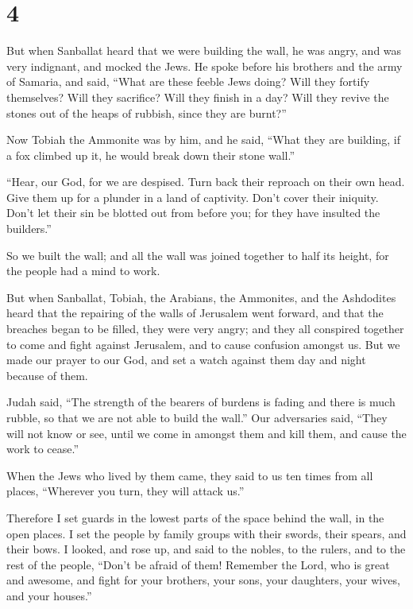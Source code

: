 \hypertarget{section-3}{%
\section{4}\label{section-3}}

 But when Sanballat heard that we were building the wall, he
was angry, and was very indignant, and mocked the Jews.  He
spoke before his brothers and the army of Samaria, and said, ``What are
these feeble Jews doing? Will they fortify themselves? Will they
sacrifice? Will they finish in a day? Will they revive the stones out of
the heaps of rubbish, since they are burnt?''

 Now Tobiah the Ammonite was by him, and he said, ``What
they are building, if a fox climbed up it, he would break down their
stone wall.''

 ``Hear, our God, for we are despised. Turn back their
reproach on their own head. Give them up for a plunder in a land of
captivity.  Don't cover their iniquity. Don't let their sin
be blotted out from before you; for they have insulted the builders.''

 So we built the wall; and all the wall was joined together
to half its height, for the people had a mind to work.

 But when Sanballat, Tobiah, the Arabians, the Ammonites,
and the Ashdodites heard that the repairing of the walls of Jerusalem
went forward, and that the breaches began to be filled, they were very
angry;  and they all conspired together to come and fight
against Jerusalem, and to cause confusion amongst us.  But
we made our prayer to our God, and set a watch against them day and
night because of them.

 Judah said, ``The strength of the bearers of burdens is
fading and there is much rubble, so that we are not able to build the
wall.''  Our adversaries said, ``They will not know or see,
until we come in amongst them and kill them, and cause the work to
cease.''

 When the Jews who lived by them came, they said to us ten
times from all places, ``Wherever you turn, they will attack us.''

 Therefore I set guards in the lowest parts of the space
behind the wall, in the open places. I set the people by family groups
with their swords, their spears, and their bows.  I looked,
and rose up, and said to the nobles, to the rulers, and to the rest of
the people, ``Don't be afraid of them! Remember the Lord, who is great
and awesome, and fight for your brothers, your sons, your daughters,
your wives, and your houses.''

